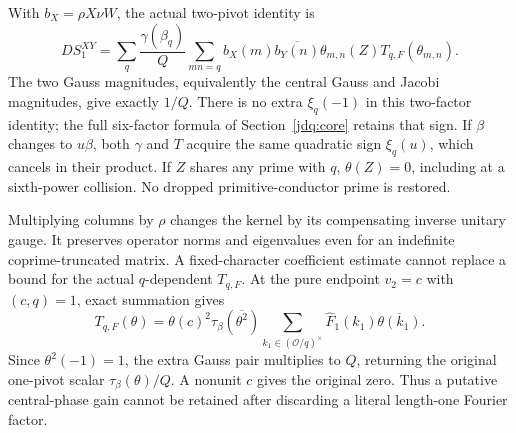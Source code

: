 \documentclass[11pt]{article}
\theoremstyle{definition}\newtheorem{definition}[theorem]{Definition}
\theoremstyle{remark}\newtheorem{remark}[theorem]{Remark}
\begin{document}
With $b_X=\rho X\nu W$, the actual two-pivot identity is
\begin{equation}\label{sw:dual}
 DS_1^{XY}=\sum_q\frac{\gamma(\beta_q)}{Q}
   \sum_{mn=q} b_X(m)\overline{b_Y(n)}\theta_{m,n}(Z)
                        T_{q,F}(\theta_{m,n}).
\end{equation}
The two Gauss magnitudes, equivalently the central Gauss and Jacobi
magnitudes, give exactly $1/Q$.
There is no extra $\xi_q(-1)$ in this two-factor identity; the full
six-factor formula of Section~\ref{jdq:core} retains that sign.
If $\beta$ changes to $u\beta$, both $\gamma$ and $T$ acquire the same
quadratic sign $\xi_q(u)$, which cancels in their product.
If $Z$ shares any prime with $q$, $\theta(Z)=0$, including at a
sixth-power collision. No dropped primitive-conductor prime is restored.

Multiplying columns by $\rho$ changes the kernel by its compensating
inverse unitary gauge. It preserves operator norms and eigenvalues even
for an indefinite coprime-truncated matrix. A fixed-character coefficient
estimate cannot replace a bound for the actual $q$-dependent $T_{q,F}$.
At the pure endpoint $v_2=c$ with $(c,q)=1$, exact summation gives
\[
 T_{q,F}(\theta)=\theta(c)^2\tau_\beta(\overline{\theta^2})
       \sum_{k_1\in(\mathcal O/q)^\times}\widehat F_1(k_1)
                                      \overline{\theta(k_1)}.
\]
Since $\theta^2(-1)=1$, the extra Gauss pair multiplies to $Q$,
returning the original one-pivot scalar $\tau_\beta(\theta)/Q$.
A nonunit $c$ gives the original zero. Thus a putative central-phase gain
cannot be retained after discarding a literal length-one Fourier factor.
\end{document}
